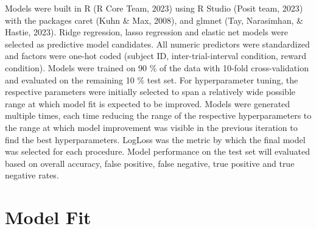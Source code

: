 \documentclass[
  man]{apa6}
\begin{document}
Models were built in R (R Core Team, 2023) using R Studio (Posit team, 2023) with the packages caret (Kuhn \& Max, 2008), and glmnet (Tay, Narasimhan, \& Hastie, 2023). Ridge regression, lasso regression and elastic net models were selected as predictive model candidates. All numeric predictors were standardized and factors were one-hot coded (subject ID, inter-trial-interval condition, reward condition). Models were trained on 90 \% of the data with 10-fold cross-validation and evaluated on the remaining 10 \% test set. For hyperparameter tuning, the respective parameters were initially selected to span a relatively wide possible range at which model fit is expected to be improved. Models were generated multiple times, each time reducing the range of the respective hyperparameters to the range at which model improvement was visible in the previous iteration to find the best hyperparameters. LogLoss was the metric by which the final model was selected for each procedure. Model performance on the test set will evaluated based on overall accuracy, false positive, false negative, true positive and true negative rates.

\hypertarget{model-fit}{%
\section{Model Fit}\label{model-fit}}
\end{document}
